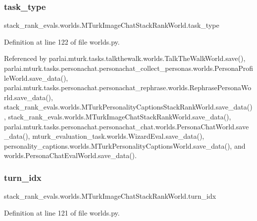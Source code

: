 \subsubsection{\texorpdfstring{task\+\_\+type}{task\_type}}
{\footnotesize\ttfamily stack\+\_\+rank\+\_\+evals.\+worlds.\+M\+Turk\+Image\+Chat\+Stack\+Rank\+World.\+task\+\_\+type}



Definition at line 122 of file worlds.\+py.



Referenced by parlai.\+mturk.\+tasks.\+talkthewalk.\+worlds.\+Talk\+The\+Walk\+World.\+save(), parlai.\+mturk.\+tasks.\+personachat.\+personachat\+\_\+collect\+\_\+personas.\+worlds.\+Persona\+Profile\+World.\+save\+\_\+data(), parlai.\+mturk.\+tasks.\+personachat.\+personachat\+\_\+rephrase.\+worlds.\+Rephrase\+Persona\+World.\+save\+\_\+data(), stack\+\_\+rank\+\_\+evals.\+worlds.\+M\+Turk\+Personality\+Captions\+Stack\+Rank\+World.\+save\+\_\+data(), stack\+\_\+rank\+\_\+evals.\+worlds.\+M\+Turk\+Image\+Chat\+Stack\+Rank\+World.\+save\+\_\+data(), parlai.\+mturk.\+tasks.\+personachat.\+personachat\+\_\+chat.\+worlds.\+Persona\+Chat\+World.\+save\+\_\+data(), mturk\+\_\+evaluation\+\_\+task.\+worlds.\+Wizard\+Eval.\+save\+\_\+data(), personality\+\_\+captions.\+worlds.\+M\+Turk\+Personality\+Captions\+World.\+save\+\_\+data(), and worlds.\+Persona\+Chat\+Eval\+World.\+save\+\_\+data().

\mbox{\label{classstack__rank__evals_1_1worlds_1_1MTurkImageChatStackRankWorld_af756cabfda3d8880e7df3fcb95bbed46}} 
\subsubsection{\texorpdfstring{turn\+\_\+idx}{turn\_idx}}
{\footnotesize\ttfamily stack\+\_\+rank\+\_\+evals.\+worlds.\+M\+Turk\+Image\+Chat\+Stack\+Rank\+World.\+turn\+\_\+idx}



Definition at line 121 of file worlds.\+py.



